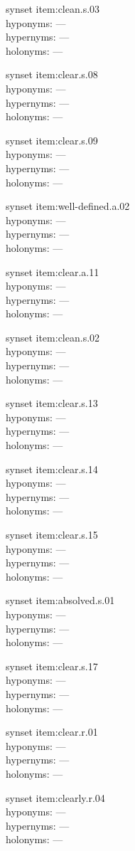 \begin{multicols}{2}
synset item:clean.s.03\\
hyponyms: ---\\
hypernyms: ---\\
holonyms: ---

synset item:clear.s.08\\
hyponyms: ---\\
hypernyms: ---\\
holonyms: ---

synset item:clear.s.09\\
hyponyms: ---\\
hypernyms: ---\\
holonyms: ---

synset item:well-defined.a.02\\
hyponyms: ---\\
hypernyms: ---\\
holonyms: ---

synset item:clear.a.11\\
hyponyms: ---\\
hypernyms: ---\\
holonyms: ---

synset item:clean.s.02\\
hyponyms: ---\\
hypernyms: ---\\
holonyms: ---

synset item:clear.s.13\\
hyponyms: ---\\
hypernyms: ---\\
holonyms: ---

synset item:clear.s.14\\
hyponyms: ---\\
hypernyms: ---\\
holonyms: ---

synset item:clear.s.15\\
hyponyms: ---\\
hypernyms: ---\\
holonyms: ---

synset item:absolved.s.01\\
hyponyms: ---\\
hypernyms: ---\\
holonyms: ---

synset item:clear.s.17\\
hyponyms: ---\\
hypernyms: ---\\
holonyms: ---

synset item:clear.r.01\\
hyponyms: ---\\
hypernyms: ---\\
holonyms: ---

synset item:clearly.r.04\\
hyponyms: ---\\
hypernyms: ---\\
holonyms: ---
\end{multicols}


